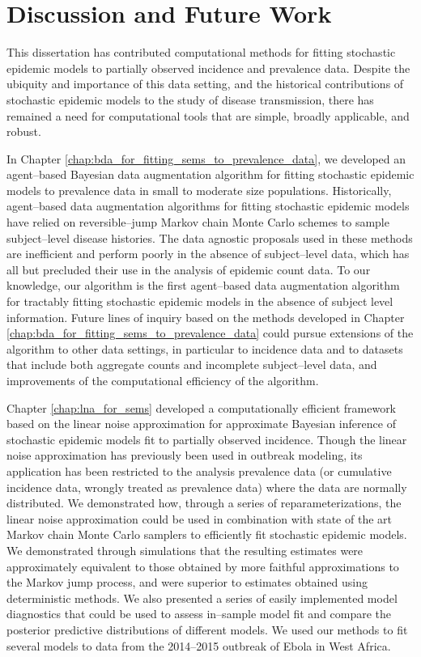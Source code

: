 \chapter{Discussion and Future Work}
\label{chap:conclusion}

This dissertation has contributed computational methods for fitting stochastic epidemic models to partially observed incidence and prevalence data. Despite the ubiquity and importance of this data setting, and the historical contributions of stochastic epidemic models to the study of disease transmission, there has remained a need for computational tools that are simple, broadly applicable, and robust. 

In Chapter \ref{chap:bda_for_fitting_sems_to_prevalence_data}, we developed an agent--based Bayesian data augmentation algorithm for fitting stochastic epidemic models to prevalence data in small to moderate size populations. Historically, agent--based data augmentation algorithms for fitting stochastic epidemic models have relied on reversible--jump Markov chain Monte Carlo schemes to sample subject--level disease histories. The data agnostic proposals used in these methods are inefficient and perform poorly in the absence of subject--level data, which has all but precluded their use in the analysis of epidemic count data. To our knowledge, our algorithm is the first agent--based data augmentation algorithm for tractably fitting stochastic epidemic models in the absence of subject level information. Future lines of inquiry based on the methods developed in Chapter \ref{chap:bda_for_fitting_sems_to_prevalence_data} could pursue extensions of the algorithm to other data settings, in particular to incidence data and to datasets that include both aggregate counts and incomplete subject--level data, and improvements of the computational efficiency of the algorithm.

Chapter \ref{chap:lna_for_sems} developed a computationally efficient framework based on the linear noise approximation for approximate Bayesian inference of stochastic epidemic models fit to partially observed incidence. Though the linear noise approximation has previously been used in outbreak modeling, its application has been restricted to the analysis prevalence data (or cumulative incidence data, wrongly treated as prevalence data) where the data are normally distributed. We demonstrated how, through a series of reparameterizations, the linear noise approximation could be used in combination with state of the art Markov chain Monte Carlo samplers to efficiently fit stochastic epidemic models. We demonstrated through simulations that the resulting estimates were approximately equivalent to those obtained by more faithful approximations to the Markov jump process, and were superior to estimates obtained using deterministic methods. We also presented a series of easily implemented model diagnostics that could be used to assess in--sample model fit and compare the posterior predictive distributions of different models. We used our methods to fit several models to data from the 2014--2015 outbreak of Ebola in West Africa. 

